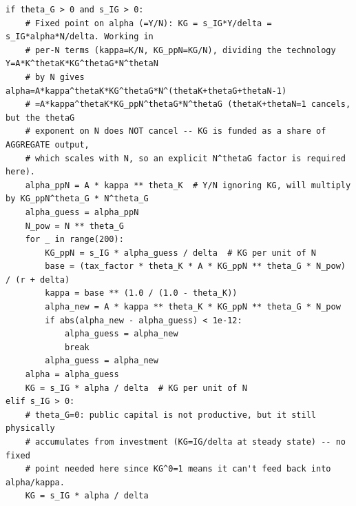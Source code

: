 \documentclass[11pt]{article}
\begin{document}
\begin{lstlisting}[firstnumber=72]
if theta_G > 0 and s_IG > 0:
    # Fixed point on alpha (=Y/N): KG = s_IG*Y/delta = s_IG*alpha*N/delta. Working in
    # per-N terms (kappa=K/N, KG_ppN=KG/N), dividing the technology Y=A*K^thetaK*KG^thetaG*N^thetaN
    # by N gives alpha=A*kappa^thetaK*KG^thetaG*N^(thetaK+thetaG+thetaN-1)
    # =A*kappa^thetaK*KG_ppN^thetaG*N^thetaG (thetaK+thetaN=1 cancels, but the thetaG
    # exponent on N does NOT cancel -- KG is funded as a share of AGGREGATE output,
    # which scales with N, so an explicit N^thetaG factor is required here).
    alpha_ppN = A * kappa ** theta_K  # Y/N ignoring KG, will multiply by KG_ppN^theta_G * N^theta_G
    alpha_guess = alpha_ppN
    N_pow = N ** theta_G
    for _ in range(200):
        KG_ppN = s_IG * alpha_guess / delta  # KG per unit of N
        base = (tax_factor * theta_K * A * KG_ppN ** theta_G * N_pow) / (r + delta)
        kappa = base ** (1.0 / (1.0 - theta_K))
        alpha_new = A * kappa ** theta_K * KG_ppN ** theta_G * N_pow
        if abs(alpha_new - alpha_guess) < 1e-12:
            alpha_guess = alpha_new
            break
        alpha_guess = alpha_new
    alpha = alpha_guess
    KG = s_IG * alpha / delta  # KG per unit of N
elif s_IG > 0:
    # theta_G=0: public capital is not productive, but it still physically
    # accumulates from investment (KG=IG/delta at steady state) -- no fixed
    # point needed here since KG^0=1 means it can't feed back into alpha/kappa.
    KG = s_IG * alpha / delta
\end{lstlisting}
\label{sec:kgfixedpoint}
\end{document}
